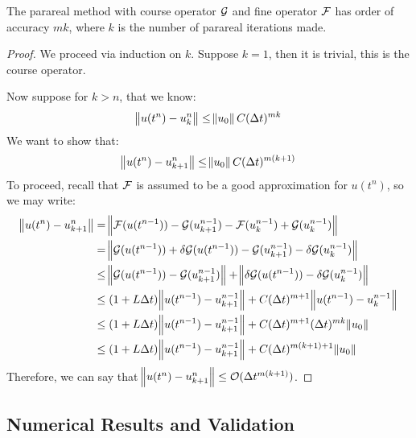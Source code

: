 \begin{theorem*}
  The parareal method with course operator $\mathcal{G}$ and fine operator $\mathcal{F}$
  has order of accuracy $mk$, where $k$ is the number of parareal iterations
  made.
\end{theorem*}
\begin{proof}
  We proceed via induction on $k$. Suppose $k = 1$, then it is trivial, this is
  the course operator.

  Now suppose for $k > n$, that we know:
  \[
    \norm{u(t^n) - u_k^n} \leq \norm{u_0}C(\Delta t)^{mk}
  \]
  We want to show that:
  \[
    \norm{u(t^n) - u_{k+1}^n} \leq \norm{u_0}C(\Delta t)^{m(k+1)}
  \]
  To proceed, recall that $\mathcal{F}$ is assumed to be a good approximation for
  $u(t^n)$, so we may write:
  \begin{align*}
    \norm{u(t^n) - u_{k+1}^n} & = \norm{\mathcal{F}(u(t^{n-1})) -
    \mathcal{G}(u^{n-1}_{k+1}) - \mathcal{F}(u^{n-1}_k) + \mathcal{G}(u^{n-1}_k)} \\
    & = \norm{\mathcal{G}(u(t^{n-1})) + \delta \mathcal{G} (u(t^{n-1}))  -
    \mathcal{G}(u^{n-1}_{k+1}) - \delta \mathcal{G}(u^{n-1}_k)} \\
    & \leq \norm{\mathcal{G}(u(t^{n-1})) - \mathcal{G}(u^{n-1}_{k+1})} + 
    \norm{ \delta \mathcal{G} (u(t^{n-1})) - \delta \mathcal{G}(u^{n-1}_k)} \\
    & \leq (1+L\Delta t)\norm{u(t^{n-1}) - u^{n-1}_{k+1}} + 
    C(\Delta t)^{m+1}\norm{ u(t^{n-1}) - u^{n-1}_k} \\
    & \leq (1+L\Delta t)\norm{u(t^{n-1}) - u^{n-1}_{k+1}} + 
    C(\Delta t)^{m+1}(\Delta t)^{mk}\norm{ u_0 } \\
    & \leq (1+L\Delta t)\norm{u(t^{n-1}) - u^{n-1}_{k+1}} + 
    C(\Delta t)^{m(k+1)+1}\norm{ u_0 } \\
  \end{align*}
  Therefore, we can say that $\norm{u(t^n) - u_{k+1}^n} \leq \mathcal{O}(\Delta
  t^{m(k+1)})$.
\end{proof}

\subsection{Numerical Results and Validation}


